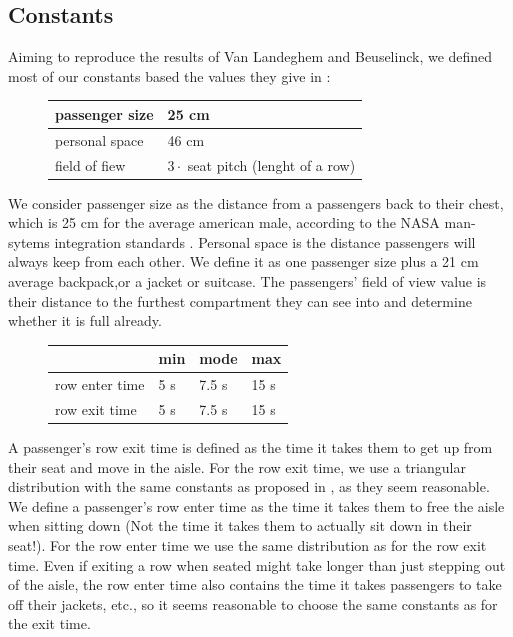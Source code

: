 \documentclass[11pt]{article}
\begin{document}
\subsection{Constants}
Aiming to reproduce the results of Van Landeghem and Beuselinck, we defined most of our constants based the values they give in \cite{beus}:

\begin{figure}[h!]
\begin{tabular}{l|l}

	\hline
	passenger size & 25 cm \\
	\hline
	personal space & 46 cm\\
	\hline
	field of fiew & $3 \cdot$ seat pitch (lenght of a row)\\
	\hline
\end{tabular}

\end{figure}

	We consider passenger size as the distance from a passengers back to their chest, which is 25 cm for the average american male, according to the NASA man-sytems integration standards \cite{nasa}. Personal space is the distance passengers will always keep from each other. We define it as one passenger size plus a 21 cm average backpack,or a jacket or suitcase.
	The passengers' field of view value is their distance to the furthest compartment they can see into and determine whether it is full already.

\begin{figure}[h!]
\begin{tabular}{l|l l l}

	&min &mode&max \\
	\hline
row enter time & 5 s &7.5 s & 15 s \\
	\hline
	row exit time& 5 s &7.5 s & 15 s \\
	\hline
\end{tabular}
\end{figure}

A passenger's row exit time is defined as the time it takes them to get up from their seat and move in the aisle. For the row exit time, we use a triangular distribution with the same constants as proposed in \cite{beus}, as they seem reasonable. We define a passenger's row enter time as the time it takes them to free the aisle when sitting down (Not the time it takes them to actually sit down in their seat!). For the row enter time we use the same distribution as for the row exit time. Even if exiting a row when seated might take longer than just stepping out of the aisle, the row enter time also contains the time it takes passengers to take off their jackets, etc., so it seems reasonable to choose the same constants as for the exit time.
\end{document}
